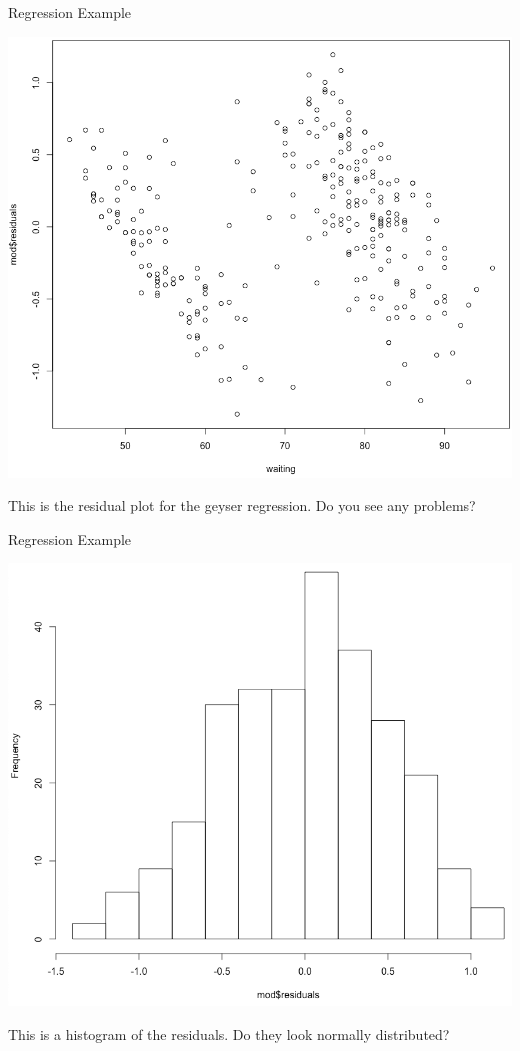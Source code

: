 \begin{frame}{Regression Example}
    \vspace{-18pt}\begin{center}
        \includegraphics[scale=0.25]{images/geyserResid.png}
    \end{center}
    \vspace{-12pt}This is the residual plot for the geyser regression. Do you see any problems?
\end{frame}

\begin{frame}{Regression Example}
    \vspace{-18pt}\begin{center}
        \includegraphics[scale=0.25]{images/residhist.png}
    \end{center}
    \vspace{-12pt}This is a histogram of the residuals. Do they look normally distributed?
\end{frame}

